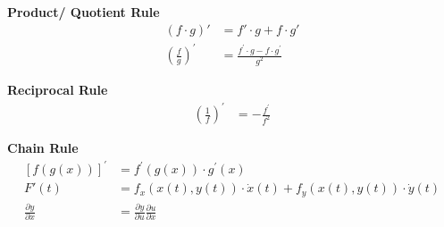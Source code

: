 \textbf{Product/ Quotient Rule}
\begin{align*}
    (f\cdot g)'                      & =f'\cdot g+f\cdot g'                             \\
    {\left(\frac fg\right)}^{\prime} & =\frac{f^{\prime}\cdot g-f\cdot g^{\prime}}{g^2}
\end{align*}

\textbf{Reciprocal Rule}
\begin{align*}
    {\left(\frac{1}{f}\right)}^{\prime} & = -\frac{f^{\prime}}{f^2}
\end{align*}

\textbf{Chain Rule}
\begin{align*}
    {[f(g(x))]}^{\prime}          & =f^{\prime}(g(x))\cdot g^{\prime}(x)                         \\
    F'(t)                         & =f_x(x(t),y(t))\cdot\dot{x}(t)+f_y(x(t),y(t))\cdot\dot{y}(t) \\
    \frac{\partial y}{\partial x} & = \frac{\partial y}{\partial u}\frac{\partial u}{\partial x}
\end{align*}

